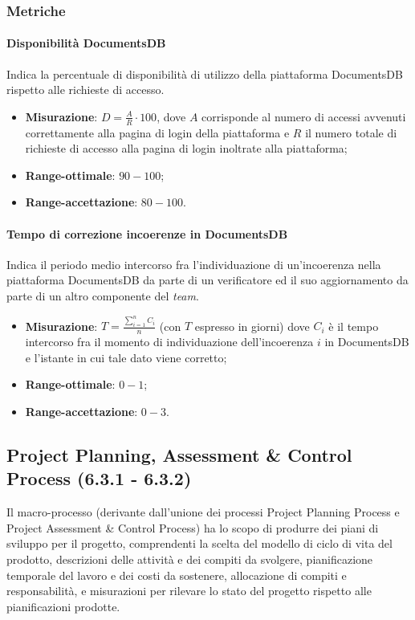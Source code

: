 \subsubsection{Metriche}
\paragraph{Disponibilità DocumentsDB}
Indica la percentuale di disponibilità di utilizzo della piattaforma DocumentsDB rispetto alle richieste di accesso.
\begin{itemize}
\item \textbf{Misurazione}: $ D = \frac{A}{R} \cdot 100 $, dove $A$ corrisponde al numero di accessi avvenuti correttamente alla pagina di login della piattaforma e $R$ il numero totale di richieste di accesso alla pagina di login inoltrate alla piattaforma;
\item \textbf{Range-ottimale}: $90 - 100$;
\item \textbf{Range-accettazione}: $80 - 100$.
\end{itemize}
\paragraph{Tempo di correzione incoerenze in DocumentsDB}
Indica il periodo medio intercorso fra l'individuazione di un'incoerenza nella piattaforma DocumentsDB da parte di un verificatore ed il suo aggiornamento da parte di un altro componente del \textit{team}.
\begin{itemize}
\item \textbf{Misurazione}: $T = \frac{\sum_{i=1}^{n} C_{i}}{n}$ (con $T$ espresso in giorni) dove $C_{i}$ è il tempo intercorso fra il momento di individuazione dell'incoerenza $i$ in DocumentsDB e l'istante in cui tale dato viene corretto;
\item \textbf{Range-ottimale}: $0 - 1$;
\item \textbf{Range-accettazione}: $0 - 3$.
\end{itemize}

\subsection{Project Planning, Assessment \& Control Process (6.3.1 - 6.3.2)}
Il macro-processo (derivante dall'unione dei processi Project Planning Process e Project Assessment \& Control Process) ha lo scopo di produrre dei piani di sviluppo per il progetto, comprendenti la scelta del modello di ciclo di vita del prodotto, descrizioni delle attività e dei compiti da svolgere, pianificazione temporale del lavoro e dei costi da sostenere, allocazione di compiti e responsabilità, e misurazioni per rilevare lo stato del progetto rispetto alle pianificazioni prodotte.
